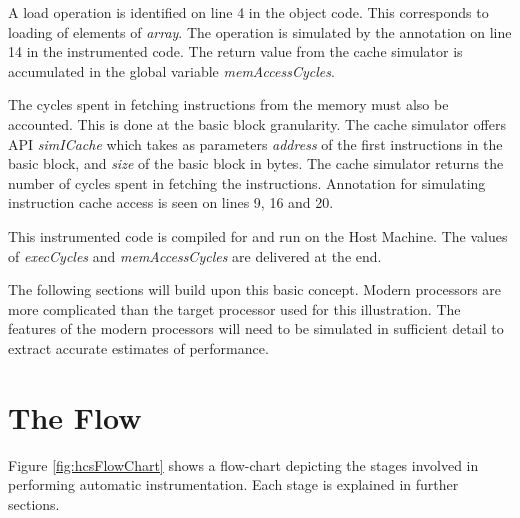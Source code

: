 A load operation is identified on line 4 in the object code. This corresponds to loading of elements of \emph{array}. The operation is simulated by the annotation on line 14 in the instrumented code. The return value from the cache simulator is accumulated in the global variable \emph{memAccessCycles}.

The cycles spent in fetching instructions from the memory must also be accounted. This is done at the basic block granularity. The cache simulator offers API \emph{simICache} which takes as parameters \emph{address} of the first instructions in the basic block, and \emph{size} of the basic block in bytes. The cache simulator returns the number of cycles spent in fetching the instructions. Annotation for simulating instruction cache access is seen on lines 9, 16 and 20.

This instrumented code is compiled for and run on the Host Machine. The values of \emph{execCycles} and \emph{memAccessCycles} are delivered at the end. 

The following sections will build upon this basic concept. Modern processors are more complicated than the target processor used for this illustration. The features of the modern processors will need to be simulated in sufficient detail to extract accurate estimates of performance.

\section{The Flow}

Figure \ref{fig:hcsFlowChart} shows a flow-chart depicting the stages involved in performing automatic instrumentation. Each stage is explained in further sections.

